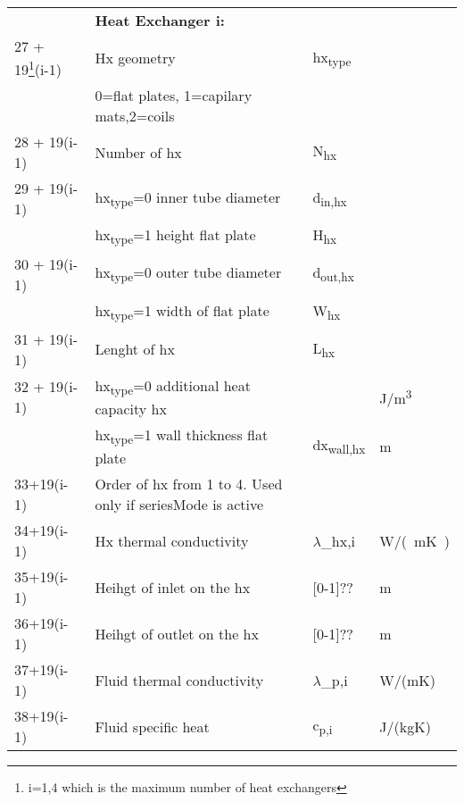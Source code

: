 \documentclass[english]{SPFReport}
\begin{document}
\begin{tabular}{| l |  m{8cm} | l | l |}
\hline
     & \textbf{Heat Exchanger i:} & & \\
  \small{ 27 + 19\footnote{i=1,4 which is the maximum number of heat exchangers}(i-1) } &Hx geometry & \si{hx_{type}}& \\  
   &0=flat plates, 1=capilary mats,2=coils &&\\
  \small{ 28 + 19(i-1)}& Number of hx & \si{N_{hx}} & \\  
  \small{ 29 + 19(i-1)}& \si{hx_{type}}=0  inner tube diameter & \si{d_{in,hx}} & \\  
                           & \si{hx_{type}}=1 height flat plate & \si{H_{hx}}& \\  
  \small{ 30 + 19(i-1)}& \si{hx_{type}}=0 outer tube diameter &\si{d_{out,hx}}& \\  
                           & \si{hx_{type}}=1  width of flat plate &\si{W_{hx}}& \\  
  \small{ 31 + 19(i-1)}& Lenght of hx  & \si{L_{hx}} & \\  
  \small{ 32 + 19(i-1)}& \si{hx_{type}}=0  additional heat capacity hx & & \si{J/m^3} \\  
                           & \si{hx_{type}}=1  wall thickness flat plate &\si{dx_{wall,hx}} & m \\  
  \small{33+19(i-1)}& Order of hx from 1 to 4. Used only if seriesMode is active  &  & \\  
  \small{34+19(i-1)}& Hx thermal conductivity  & \si{$\lambda$_{hx,i}} & \si{W/(mK)}\\
  \small{35+19(i-1)}& Heihgt of inlet on the hx & [0-1]?? & m \\
   \small{36+19(i-1)}& Heihgt of outlet on the hx & [0-1]?? & m \\
 
   \small{37+19(i-1)}& Fluid thermal conductivity & \si{$\lambda$_{p,i}} & W/(mK) \\
   \small{38+19(i-1)}& Fluid specific heat & \si{c_{p,i}} & J/(kgK) \\
   

\end{tabular}
\end{document}
